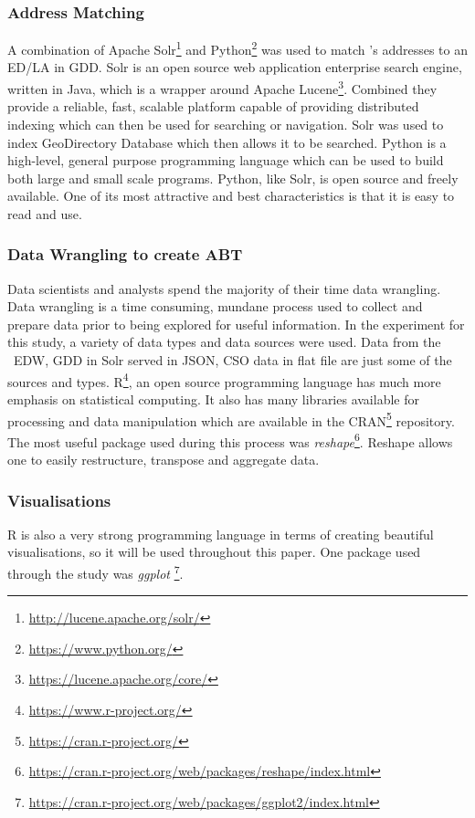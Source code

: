 \subsubsection{Address Matching}
A combination of Apache Solr\footnote{\url{http://lucene.apache.org/solr/}} and Python\footnote{\url{https://www.python.org/}} was used to match \subjectname's addresses to an ED/LA in GDD. Solr is an open source web application enterprise search engine, written in Java, which is a wrapper around Apache Lucene\footnote{{\url{https://lucene.apache.org/core/}}}. Combined they provide a reliable, fast, scalable platform capable of providing distributed indexing which can then be used for searching or navigation. Solr was used to index GeoDirectory Database which then allows it to be searched. Python is a high-level, general purpose programming language which can be used to build both large and small scale programs. Python, like Solr, is open source and freely available. One of its most attractive and best characteristics is that it is easy to read and use.

\subsubsection{Data Wrangling to create ABT}
Data scientists and analysts spend the majority of their time data wrangling. Data wrangling is a time consuming, mundane process used to collect and prepare data prior to being explored for useful information. In the experiment for this study, a variety of data types and data sources were used. Data from the \subjectname\ EDW, GDD in Solr served in JSON, CSO data in flat file are just some of the sources and types.  R\footnote{{\url{https://www.r-project.org/}}}, an open source programming language has much more emphasis on statistical computing. It also has many libraries available for processing and data manipulation which are available in the CRAN\footnote{{\url{https://cran.r-project.org/}}} repository. The most useful package used during this process was \textit{reshape}\footnote{{\url{https://cran.r-project.org/web/packages/reshape/index.html}}}. Reshape allows one to easily restructure, transpose and aggregate data.

\subsubsection{Visualisations}
R is also a very strong programming language in terms of creating beautiful visualisations, so it will be used throughout this paper. One package used through the study was \textit{ggplot}
\footnote{{\url{https://cran.r-project.org/web/packages/ggplot2/index.html}}}. 

